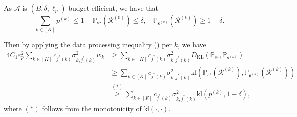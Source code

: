 \documentclass{article}
\def\vs{{\bm{s}}}
\def\gA{{\mathcal{A}}}
\def\gR{{\mathcal{R}}}
\def\sP{{\mathbb{P}}}
\newcommand{\KL}{D_{\mathrm{KL}}}
\newcommand{\kl}{\mathrm{kl}}
\theoremstyle{plain}
\theoremstyle{definition}
\theoremstyle{plain}
\begin{document}
As $\gA$ is $(B, \delta, \ell_p)$-budget efficient, we have that
\begin{equation}
    \sum_{k \in [K]} p^{(k)} \leq 1 - \sP_{\vs^\star}(\gR^{(0)}) \leq \delta, \quad
    \sP_{\vs^{(k)}}(\gR^{(k)}) \geq 1 - \delta.
\end{equation}

Then by applying the data processing inequality () per $k$, we have
\begin{align}
    4 C_1 \varepsilon_p^2 \sum_{k \in [K]} c_{j^*(k)} \sigma_{k,j^*(k)}^2 w_k &\geq \sum_{k \in [K]} c_{j^*(k)} \sigma_{k,j^*(k)}^2 \KL(\sP_{s^\star}, \sP_{\vs^{(k)}}) \\
    &\geq \sum_{k \in [K]} c_{j^*(k)} \sigma_{k,j^*(k)}^2 \kl(\sP_{s^\star}(\gR^{(k)}), \sP_{\vs^{(k)}}(\gR^{(k)})) \\
    &\overset{(*)}{\geq} \sum_{k \in [K]} c_{j^*(k)} \sigma_{k,j^*(k)}^2 \kl(p^{(k)}, 1 - \delta),
\end{align}
where $(*)$ follows from the monotonicity of $\kl(\cdot, \cdot)$.
\end{document}
